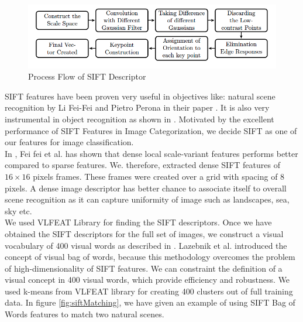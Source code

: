  \begin{center}
\begin{figure}
\centering
\includegraphics[width=\linewidth]{./Pictures/SIFT/siftSteps.jpg}
\caption{Process Flow of SIFT Descriptor }
\label{fig:siftProcess}
\end{figure}
\end{center}
\hspace*{1 cm} SIFT features have been proven very useful in objectives like: natural scene recognition by Li Fei-Fei and Pietro Perona in their paper \cite{naturalSceneRecognition}. It is also very instrumental in object recognition as shown in \cite{lowe}. Motivated by the excellent performance of SIFT Features in Image Categorization, we decide SIFT as one of our features for image classification.\\
    In \cite{naturalSceneRecognition}, Fei fei et al. has shown that dense local scale-variant features performs better compared to sparse features. We. therefore, extracted dense SIFT features of $16 \times 16$ pixels frames. These frames were created over a grid with spacing of 8 pixels. A dense image descriptor has better chance to associate itself to overall scene recognition as it can capture uniformity of image such as landscapes, sea, sky etc. \\
    We used VLFEAT Library for finding the SIFT descriptors. Once we have obtained the SIFT descriptors for the full set of images, we construct a visual vocabulary of 400 visual words as described in \cite{bagOfWords}. Lazebnik et al. \cite{bagOfWords} introduced the concept of visual bag of words, because this methodology overcomes the problem of high-dimensionality of SIFT features. We can constraint the definition of a visual concept in 400 visual words, which provide efficiency and robustness. We used k-means from VLFEAT library \cite{vlfeat} for creating 400 clusters out of full training data. In figure \ref{fig:siftMatching}, we have given an example of using SIFT Bag of Words features to match two natural scenes.\\
